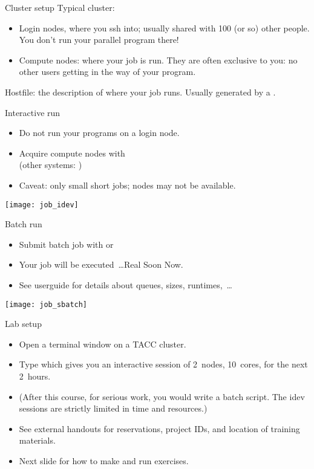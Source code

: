 \begin{numberedframe}{Cluster setup}
  \small
  Typical cluster:
  \begin{itemize}
  \item Login nodes, where you ssh into; usually shared with 100 (or
    so) other people. You don't run your parallel program there!
  \item Compute nodes: where your job is run. They are often exclusive
    to you: no other users getting in the way of your program.
  \end{itemize}
  Hostfile: the description of where your job runs. Usually generated
  by a .
\end{numberedframe}

\begin{numberedframe}{Interactive run}
  \begin{itemize}
  \item Do not run your programs on a login node.
  \item Acquire compute nodes with  \\
    (other systems: )
  \item Caveat: only small short jobs; nodes may not be available.
  \end{itemize}
  \texttt{[image: job\_idev]}
\end{numberedframe}

\begin{numberedframe}{Batch run}
  \begin{itemize}
  \item Submit batch job with  or 
  \item Your job will be executed~\ldots Real Soon Now.
  \item See userguide for details about queues, sizes, runtimes,~\ldots
  \end{itemize}
  \texttt{[image: job\_sbatch]}
\end{numberedframe}

\begin{tacc}
\begin{numberedframe}{Lab setup}
    \begin{itemize}
    \item Open a terminal window on a TACC cluster.
    \item Type  which gives
      you an interactive session of 2~nodes, 10~cores, for the next
      2~hours.
    \item (After this course, for serious work, you would write a
      batch script. The idev sessions are strictly limited in time and
      resources.)
    \item See external handouts for reservations, project IDs,
      and location of training materials.
    \item Next slide for how to make and run exercises.
    \end{itemize}
\end{numberedframe}
\end{tacc}

